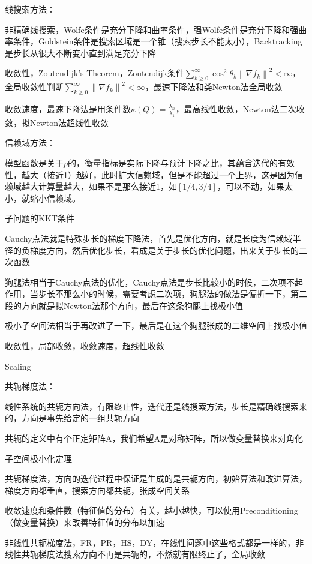 线搜索方法：

非精确线搜索，Wolfe条件是充分下降和曲率条件，强Wolfe条件是充分下降和强曲率条件，Goldstein条件是搜索区域是一个锥（搜索步长不能太小），Backtracking是步长从很大不断变小直到满足充分下降

收敛性，Zoutendijk's Theorem，Zoutendijk条件$\sum_{k \geq 0}^{\infty} \cos^{2} \theta_{k}\left\|\nabla f_{k}\right\|^{2}<\infty$，全局收敛性判断$\sum_{k \geq 0}^{\infty} \left\|\nabla f_{k}\right\|^{2}<\infty$，最速下降法和类Newton法全局收敛

收敛速度，最速下降法是用条件数$\kappa(Q) = \frac{\lambda_n}{\lambda_1}$，最高线性收敛，Newton法二次收敛，拟Newton法超线性收敛

信赖域方法：

模型函数是关于$p$的，衡量指标是实际下降与预计下降之比，其蕴含迭代的有效性，越大（接近1）越好，此时扩大信赖域，但是不能超过一个上界，这是因为信赖域越大计算量越大，如果不是那么接近1，如$[1/4, 3/4]$，可以不动，如果太小，就缩小信赖域。

子问题的KKT条件

Cauchy点法就是特殊步长的梯度下降法，首先是优化方向，就是长度为信赖域半径的负梯度方向，然后优化步长，看成是关于步长的优化问题，出来关于步长的二次函数

狗腿法相当于Cauchy点法的优化，Cauchy点法是步长比较小的时候，二次项不起作用，当步长不那么小的时候，需要考虑二次项，狗腿法的做法是偏折一下，第二段的方向就是拟Newton法那个方向，最后在这条狗腿上找极小值

极小子空间法相当于再改进了一下，最后是在这个狗腿张成的二维空间上找极小值

收敛性，局部收敛，收敛速度，超线性收敛

Scaling

共轭梯度法：

线性系统的共轭方向法，有限终止性，迭代还是线搜索方法，步长是精确线搜索来的，方向是事先给定的一组共轭方向

共轭的定义中有个正定矩阵A，我们希望A是对称矩阵，所以做变量替换来对角化

子空间极小化定理

共轭梯度法，方向的迭代过程中保证是生成的是共轭方向，初始算法和改进算法，梯度方向都垂直，搜索方向都共轭，张成空间关系

收敛速度和条件数（特征值的分布）有关，越小越快，可以使用Preconditioning（做变量替换）来改善特征值的分布以加速

非线性共轭梯度法，FR，PR，HS，DY，在线性问题中这些格式都是一样的，非线性共轭梯度法搜索方向不再是共轭的，不然就有限终止了，全局收敛

